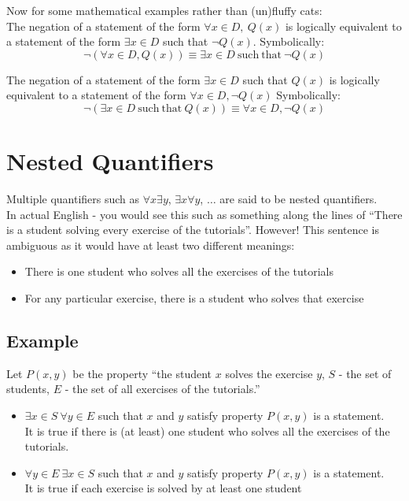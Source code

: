 Now for some mathematical examples rather than (un)fluffy cats:\\

The negation of a statement of the form $\forall x \in D,\ Q(x)$ is logically equivalent to a statement of the form $\exists x \in D$ such that $\neg Q(x)$. Symbolically:
\[ \neg(\forall x \in D, Q(x)) \equiv \exists x \in D \mathrm{\ such\ that\ } \neg Q(x) \]

The negation of a statement of the form $\exists x \in D$ such that $Q(x)$ is logically equivalent to a statement of the form $\forall x \in D, \neg Q(x)$ Symbolically:
\[ \neg(\exists x \in D \mathrm{\ such\ that\ } Q(x)) \equiv \forall x \in D, \neg Q(x) \]

\section{Nested Quantifiers}
Multiple quantifiers such as $\forall x \exists y$, $\exists x \forall y$, $\ldots$ are said to be nested quantifiers.\\

In actual English - you would see this such as something along the lines of ``There is a student solving every exercise of the tutorials''. However! This sentence is ambiguous as it would have at least two different meanings:
\begin{itemize}
    \item There is one student who solves all the exercises of the tutorials
    \item For any particular exercise, there is a student who solves that exercise
\end{itemize}

\subsection{Example}
Let $P(x,y)$ be the property ``the student $x$ solves the exercise $y$, $S$ - the set of students, $E$ - the set of all exercises of the tutorials.''
\begin{itemize}
    \item $\exists x \in S\ \forall y \in E$ such that $x$ and $y$ satisfy property $P(x,y)$ is a statement.\\
    It is true if there is (at least) one student who solves all the exercises of the tutorials.
    \item $\forall y \in E\ \exists x \in S$ such that $x$ and $y$ satisfy property $P(x,y)$ is a statement.\\
    It is true if each exercise is solved by at least one student
\end{itemize}